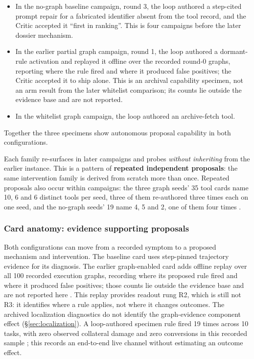 \begin{itemize}
  \item In the no-graph baseline campaign, round 3, the loop authored a
        step-cited prompt repair for a fabricated identifier absent from the
        tool record, and the Critic accepted it ``first in ranking''. This is
        four campaigns before the later dossier mechanism.
  \item In the earlier partial graph campaign, round 1, the loop authored a
        dormant-rule activation and replayed it offline over the recorded
        round-0 graphs, reporting where the rule fired and where it produced
        false positives; the Critic accepted it to ship alone. This is an
        archival capability specimen, not an arm result from the later
        whitelist comparison; its counts lie outside the evidence base and
        are not reported.
  \item In the whitelist graph campaign, the loop authored an archive-fetch
        tool.
\end{itemize}

Together the three specimens show autonomous proposal capability in both
configurations.

Each family re-surfaces in later campaigns and probes \emph{without
inheriting} from the earlier instance. This is a pattern of \textbf{repeated independent proposals}: the same
intervention family is derived from scratch more than once. Repeated proposals also occur within campaigns: the three graph
seeds' 35 tool cards name 10, 6 and 6 distinct tools per seed, three of
them re-authored three times each on one seed, and the no-graph seeds' 19
name 4, 5 and 2, one of them four times .

\subsubsection*{Card anatomy: evidence supporting proposals}

Both configurations can move from a recorded symptom to a proposed mechanism
and intervention. The baseline card uses step-pinned trajectory evidence for
its diagnosis. The earlier graph-enabled card adds offline replay over all
100 recorded execution graphs, recording where its proposed rule fired and
where it produced false positives; those counts lie outside the evidence
base and are not reported here . This replay provides
readout rung R2, which is still not R3: it identifies where a rule applies,
not where it changes outcomes. The archived localization diagnostics do not
identify the graph-evidence component effect
(\S\ref{sec:localization}). A loop-authored specimen rule fired 19 times
across 10 tasks, with zero observed collateral damage and zero conversions
in this recorded sample ; this records an end-to-end live channel
without estimating an outcome effect.

